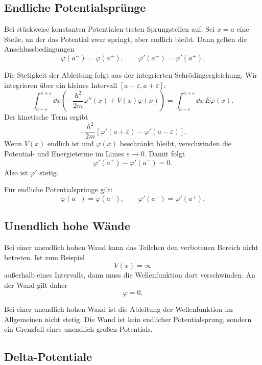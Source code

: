 \subsection{Endliche Potentialsprünge}

Bei stückweise konstanten Potentialen treten Sprungstellen auf. Sei $x=a$ eine Stelle, an der das Potential zwar springt, aber endlich bleibt. Dann gelten die Anschlussbedingungen
\[
    \varphi(a^-)=\varphi(a^+),
    \qquad
    \varphi'(a^-)=\varphi'(a^+).
\]

\begin{derivationbox}
Die Stetigkeit der Ableitung folgt aus der integrierten Schrödingergleichung. Wir integrieren über ein kleines Intervall $[a-\varepsilon,a+\varepsilon]$:
\[
    \int_{a-\varepsilon}^{a+\varepsilon}\dd x
    \left(-\frac{\hbar^2}{2m}\varphi''(x)+V(x)\varphi(x)\right)
    =\int_{a-\varepsilon}^{a+\varepsilon}\dd x\,E\varphi(x).
\]
Der kinetische Term ergibt
\[
    -\frac{\hbar^2}{2m}\left[\varphi'(a+\varepsilon)-\varphi'(a-\varepsilon)\right].
\]
Wenn $V(x)$ endlich ist und $\varphi(x)$ beschränkt bleibt, verschwinden die Potential- und Energieterme im Limes $\varepsilon\to0$. Damit folgt
\[
    \varphi'(a^+)-\varphi'(a^-)=0.
\]
Also ist $\varphi'$ stetig.
\end{derivationbox}

\begin{formulabox}
Für endliche Potentialsprünge gilt:
\[
    \boxed{\varphi(a^-)=\varphi(a^+)},
    \qquad
    \boxed{\varphi'(a^-)=\varphi'(a^+)}.
\]
\end{formulabox}

\subsection{Unendlich hohe Wände}

Bei einer unendlich hohen Wand kann das Teilchen den verbotenen Bereich nicht betreten. Ist zum Beispiel
\[
    V(x)=\infty
\]
außerhalb eines Intervalls, dann muss die Wellenfunktion dort verschwinden. An der Wand gilt daher
\[
    \varphi=0.
\]

\begin{notebox}
Bei einer unendlich hohen Wand ist die Ableitung der Wellenfunktion im Allgemeinen nicht stetig. Die Wand ist kein endlicher Potentialsprung, sondern ein Grenzfall eines unendlich großen Potentials.
\end{notebox}

\subsection{Delta-Potentiale}

